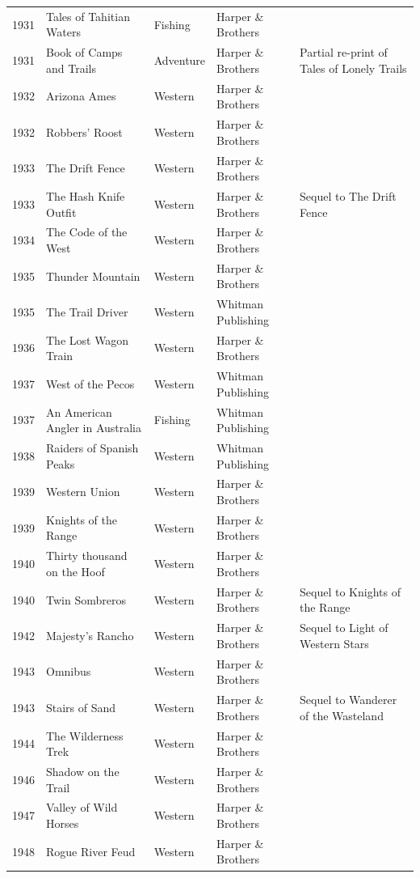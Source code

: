 \documentclass{article}
\begin{document}
\begin{tabular}{lllll}
1931 & Tales of Tahitian Waters & Fishing & Harper \& Brothers &  \\
1931 & Book of Camps and Trails & Adventure & Harper \& Brothers & Partial re-print of Tales of Lonely Trails \\
1932 & Arizona Ames & Western & Harper \& Brothers &  \\
1932 & Robbers' Roost & Western & Harper \& Brothers &  \\
1933 & The Drift Fence & Western & Harper \& Brothers &  \\
1933 & The Hash Knife Outfit & Western & Harper \& Brothers & Sequel to The Drift Fence \\
1934 & The Code of the West & Western & Harper \& Brothers &  \\
1935 & Thunder Mountain & Western & Harper \& Brothers &  \\
1935 & The Trail Driver & Western & Whitman Publishing &  \\
1936 & The Lost Wagon Train & Western & Harper \& Brothers &  \\
1937 & West of the Pecos & Western & Whitman Publishing &  \\
1937 & An American Angler in Australia & Fishing & Whitman Publishing &  \\
1938 & Raiders of Spanish Peaks & Western & Whitman Publishing &  \\
1939 & Western Union & Western & Harper \& Brothers &  \\
1939 & Knights of the Range & Western & Harper \& Brothers &  \\
1940 & Thirty thousand on the Hoof & Western & Harper \& Brothers &  \\
1940 & Twin Sombreros & Western & Harper \& Brothers & Sequel to Knights of the Range \\
1942 & Majesty’s Rancho & Western & Harper \& Brothers & Sequel to Light of Western Stars \\
1943 & Omnibus & Western & Harper \& Brothers &  \\
1943 & Stairs of Sand & Western & Harper \& Brothers & Sequel to Wanderer of the Wasteland \\
1944 & The Wilderness Trek & Western & Harper \& Brothers &  \\
1946 & Shadow on the Trail & Western & Harper \& Brothers &  \\
1947 & Valley of Wild Horses & Western & Harper \& Brothers &  \\
1948 & Rogue River Feud & Western & Harper \& Brothers &  \\

\end{tabular}
\end{document}
